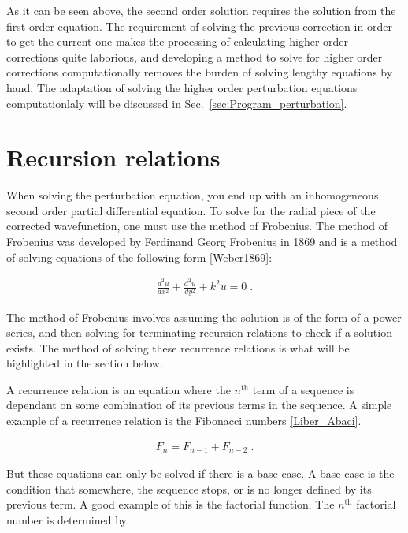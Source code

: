         \noindent As it can be seen above, the second order solution requires the solution from the first order equation. The requirement of solving the previous correction in order to get the current one makes the processing of calculating higher order corrections quite laborious, and developing a method to solve for higher order corrections computationally removes the burden of solving lengthy equations by hand. The adaptation of solving the higher order perturbation equations computationlaly will be discussed in Sec.~\ref{sec:Program_perturbation}.

    \section{Recursion relations} \label{sec:Recursion_Relations}
        When solving the perturbation equation, you end up with an inhomogeneous second order partial differential equation. To solve for the radial piece of the corrected wavefunction, one must use the method of Frobenius. The method of Frobenius was developed by Ferdinand Georg Frobenius in 1869 and is a method of solving equations of the following form \ref{Weber1869}:
        
        \begin{align}
            \frac{d^2 u}{dx^2} + \frac{d^2 u}{dy^2} + k^2 u = 0\;.
        \end{align}

        \noindent The method of Frobenius involves assuming the solution is of the form of a power series, and then solving for terminating recursion relations to check if a solution exists. The method of solving these recurrence relations is what will be highlighted in the section below. 

        A recurrence relation is an equation where the $n^{\text{th}}$ term of a sequence is dependant on some combination of its previous terms in the sequence. A simple example of a recurrence relation is the Fibonacci numbers \ref{Liber_Abaci}.

        \begin{align}
            F_n = F_{n - 1} + F_{n - 2}\;.
        \end{align}

        \noindent But these equations can only be solved if there is a base case. A base case is the condition that somewhere, the sequence stops, or is no longer defined by its previous term. A good example of this is the factorial function. The $n^{\text{th}}$ factorial number is determined by 

